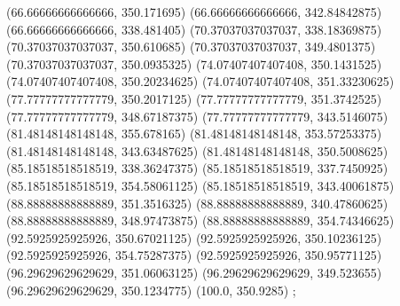 {{{		(66.66666666666666, 350.171695)
		(66.66666666666666, 342.84842875)
		(66.66666666666666, 338.481405)
		(70.37037037037037, 338.18369875)
		(70.37037037037037, 350.610685)
		(70.37037037037037, 349.4801375)
		(70.37037037037037, 350.0935325)
		(74.07407407407408, 350.1431525)
		(74.07407407407408, 350.20234625)
		(74.07407407407408, 351.33230625)
		(77.77777777777779, 350.2017125)
		(77.77777777777779, 351.3742525)
		(77.77777777777779, 348.67187375)
		(77.77777777777779, 343.5146075)
		(81.48148148148148, 355.678165)
		(81.48148148148148, 353.57253375)
		(81.48148148148148, 343.63487625)
		(81.48148148148148, 350.5008625)
		(85.18518518518519, 338.36247375)
		(85.18518518518519, 337.7450925)
		(85.18518518518519, 354.58061125)
		(85.18518518518519, 343.40061875)
		(88.88888888888889, 351.3516325)
		(88.88888888888889, 340.47860625)
		(88.88888888888889, 348.97473875)
		(88.88888888888889, 354.74346625)
		(92.5925925925926, 350.67021125)
		(92.5925925925926, 350.10236125)
		(92.5925925925926, 354.75287375)
		(92.5925925925926, 350.95771125)
		(96.29629629629629, 351.06063125)
		(96.29629629629629, 349.523655)
		(96.29629629629629, 350.1234775)
		(100.0, 350.9285)
	};

}}
